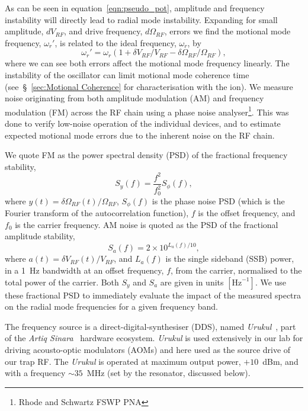     As can be seen in equation~\ref{eqn:pseudo_pot}, amplitude and frequency instability will directly lead to radial mode instability.
    Expanding for small amplitude, $dV_{RF}$, and drive frequency, $d\Omega_{RF}$, errors we find the motional mode frequency, $\omega_r'$, is related to the ideal frequency, $\omega_r$, by 
    \begin{equation}
    \omega_r' = \omega_r(1 + \delta V_{RF}/V_{RF} - \delta\Omega_{RF}/\Omega_{RF}),
    \end{equation}
    where we can see both errors affect the motional mode frequency linearly.
    The instability of the oscillator can limit motional mode coherence time (see~\S~\ref{sec:Motional Coherence} for characterisation with the ion). We measure noise originating from both amplitude modulation (AM) and frequency modulation (FM) across the RF chain using a phase noise analyser\footnote{Rhode and Schwartz FSWP PNA}. 
    This was done to verify low-noise operation of the individual devices, and to estimate expected motional mode errors due to the inherent noise on the RF chain. 

    We quote FM as the power spectral density (PSD) of the fractional frequency stability, 
    \begin{equation}
    S_y(f) = \frac{f^2}{f_0^2} S_{\phi}(f),
    \end{equation}
    where $y(t)=\delta\Omega_{RF}(t)/\Omega_{RF}$, $S_{\phi}(f)$ is the phase noise PSD (which is the Fourier transform of the autocorrelation function), $f$ is the offset frequency, and $f_0$ is the carrier frequency. AM noise is quoted as the PSD of the fractional amplitude stability,
    \begin{equation}
    S_a(f) = 2\times10^{L_a(f)/10},
    \end{equation}
    where $a(t)=\delta V_{RF}(t)/V_{RF}$, and $L_a(f)$ is the single sideband (SSB) power, in a 1~Hz bandwidth at an offset frequency, $f$, from the carrier, normalised to the total power of the carrier. Both $S_y$ and $S_a$ are given in units $\left[\unit{\hertz}^{-1}\right]$. We use these fractional PSD to immediately evaluate the impact of the measured spectra on the radial mode frequencies for a given frequency band.

    The frequency source is a direct-digital-synthesiser (DDS), named \emph{Urukul}~\cite{kasprowicz_urukul_2022}, part
    of the \emph{Artiq Sinara}~\cite{kasprowicz_artiq_2020} hardware ecosystem. \emph{Urukul} is used extensively in our lab for driving acousto-optic modulators (AOMs) and here used as the source drive of our trap RF.
    The \emph{Urukul} is operated at maximum output power, $+10$~dBm, and with a frequency $\sim 35$~MHz (set by the resonator, discussed below).


